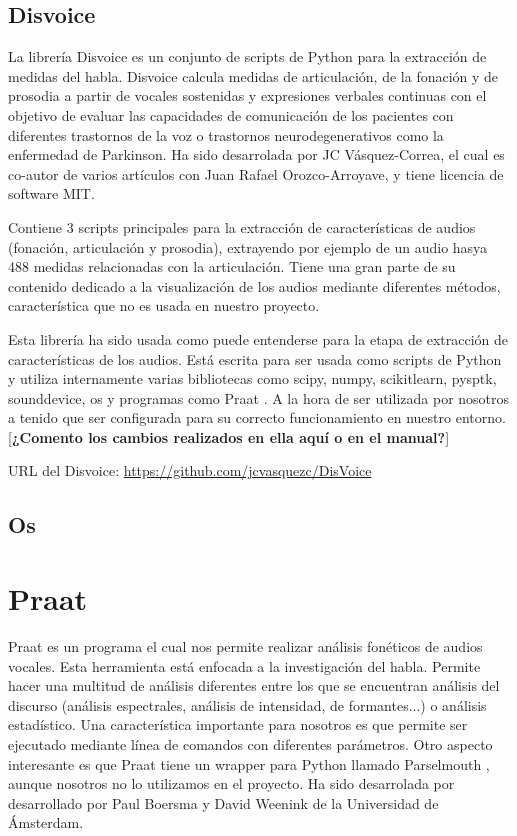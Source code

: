 \subsection{Disvoice}
La librería Disvoice \cite{neurospeech} es un conjunto de scripts de Python para la extracción de medidas del habla. Disvoice calcula medidas de articulación, de la fonación y de prosodia a partir de vocales sostenidas y expresiones verbales continuas con el objetivo de evaluar las capacidades de comunicación de los pacientes con diferentes trastornos de la voz o trastornos neurodegenerativos como la enfermedad de Parkinson. Ha sido desarrolada por JC Vásquez-Correa, el cual es co-autor de varios artículos con Juan Rafael Orozco-Arroyave, y tiene licencia de software MIT.

Contiene 3 scripts principales para la extracción de características de audios (fonación, articulación y prosodia), extrayendo por ejemplo de un audio hasya 488 medidas relacionadas con la articulación. Tiene una gran parte de su contenido dedicado a la visualización de los audios mediante diferentes métodos, característica que no es usada en nuestro proyecto. 

Esta librería ha sido usada como puede entenderse para la etapa de extracción de características de los audios. Está escrita para ser usada como scripts de Python y utiliza internamente varias bibliotecas como scipy, numpy, scikitlearn, pysptk, sounddevice, os y programas como Praat \cite{praat}. A la hora de ser utilizada por nosotros a tenido que ser configurada para su correcto funcionamiento en nuestro entorno.
[\textbf{¿Comento los cambios realizados en ella aquí o en el manual?}]

URL del Disvoice: \url{https://github.com/jcvasquezc/DisVoice}


\subsection{Os}

\section{Praat}
Praat \cite{praat} es un programa el cual nos permite realizar análisis fonéticos de audios vocales. Esta herramienta está enfocada a la investigación del habla. Permite hacer una multitud de análisis diferentes entre los que se encuentran análisis del discurso (análisis espectrales, análisis de intensidad, de formantes...) o análisis estadístico. Una característica importante para nosotros es que permite ser ejecutado mediante línea de comandos con diferentes parámetros. Otro aspecto interesante es que Praat tiene un wrapper para Python llamado Parselmouth \cite{parselmouth}, aunque nosotros no lo utilizamos en el proyecto. Ha sido desarrolada por desarrollado por Paul Boersma y David Weenink de la Universidad de Ámsterdam.

